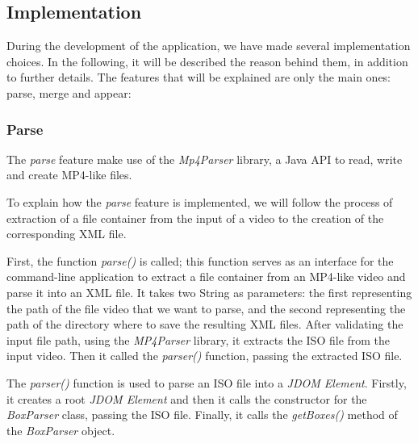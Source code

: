 \subsection{Implementation} 
 
During the development of the application, we have made several implementation choices. In the following, it will be described the reason behind them, in addition to further details. The features that will be explained are only the main ones: parse, merge and appear:

\subsubsection{Parse}

The \emph{parse} feature make use of the \emph{Mp4Parser} library, a Java API to read, write and create MP4-like files.

To explain how the \emph{parse} feature is implemented, we will follow the process of extraction of a file container from the input of a video to the creation of the corresponding XML file.

First, the function \emph{parse()} is called; this function serves as an interface for the command-line application to extract a file container from an MP4-like video and parse it into an XML file. It takes two String as parameters: the first representing the path of the file video that we want to parse, and the second representing the path of the directory where to save the resulting XML files. After validating the input file path, using the \emph{MP4Parser} library, it extracts the ISO file from the input video. Then it called the \emph{parser()} function, passing the extracted ISO file.

The \emph{parser()} function is used to parse an ISO file into a \emph{JDOM Element}. Firstly, it creates a root \emph{JDOM Element} and then it calls the constructor for the \emph{BoxParser} class, passing the ISO file. Finally, it calls the \emph{getBoxes()} method of the \emph{BoxParser} object.

